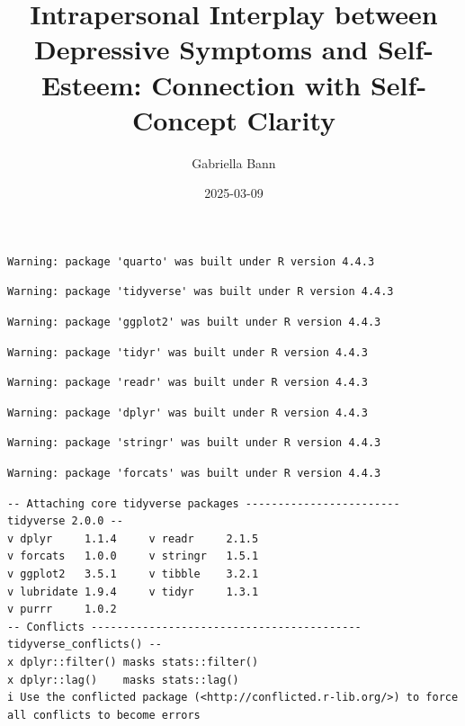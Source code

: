 \documentclass[
]{article}
\title{Intrapersonal Interplay between Depressive Symptoms and
Self-Esteem: Connection with Self-Concept Clarity}
\author{Gabriella Bann}
\date{2025-03-09}
\renewcommand*\contentsname{Table of contents}
\newcommand\contentsname{Table of contents}
\begin{document}
\maketitle

\renewcommand*\contentsname{Table of contents}
{
\hypersetup{linkcolor=}
\setcounter{tocdepth}{3}
\tableofcontents
}

\begin{verbatim}
Warning: package 'quarto' was built under R version 4.4.3
\end{verbatim}

\begin{verbatim}
Warning: package 'tidyverse' was built under R version 4.4.3
\end{verbatim}

\begin{verbatim}
Warning: package 'ggplot2' was built under R version 4.4.3
\end{verbatim}

\begin{verbatim}
Warning: package 'tidyr' was built under R version 4.4.3
\end{verbatim}

\begin{verbatim}
Warning: package 'readr' was built under R version 4.4.3
\end{verbatim}

\begin{verbatim}
Warning: package 'dplyr' was built under R version 4.4.3
\end{verbatim}

\begin{verbatim}
Warning: package 'stringr' was built under R version 4.4.3
\end{verbatim}

\begin{verbatim}
Warning: package 'forcats' was built under R version 4.4.3
\end{verbatim}

\begin{verbatim}
-- Attaching core tidyverse packages ------------------------ tidyverse 2.0.0 --
v dplyr     1.1.4     v readr     2.1.5
v forcats   1.0.0     v stringr   1.5.1
v ggplot2   3.5.1     v tibble    3.2.1
v lubridate 1.9.4     v tidyr     1.3.1
v purrr     1.0.2     
-- Conflicts ------------------------------------------ tidyverse_conflicts() --
x dplyr::filter() masks stats::filter()
x dplyr::lag()    masks stats::lag()
i Use the conflicted package (<http://conflicted.r-lib.org/>) to force all conflicts to become errors
\end{verbatim}
\end{document}
